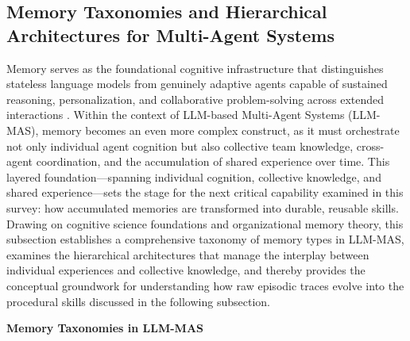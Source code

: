 \documentclass[11pt]{article}
\begin{document}
\subsection{Memory Taxonomies and Hierarchical Architectures for Multi-Agent Systems}

Memory serves as the foundational cognitive infrastructure that distinguishes stateless language models from genuinely adaptive agents capable of sustained reasoning, personalization, and collaborative problem-solving across extended interactions \cite{ref112,ref113}. Within the context of LLM-based Multi-Agent Systems (LLM-MAS), memory becomes an even more complex construct, as it must orchestrate not only individual agent cognition but also collective team knowledge, cross-agent coordination, and the accumulation of shared experience over time. This layered foundation---spanning individual cognition, collective knowledge, and shared experience---sets the stage for the next critical capability examined in this survey: how accumulated memories are transformed into durable, reusable skills. Drawing on cognitive science foundations and organizational memory theory, this subsection establishes a comprehensive taxonomy of memory types in LLM-MAS, examines the hierarchical architectures that manage the interplay between individual experiences and collective knowledge, and thereby provides the conceptual groundwork for understanding how raw episodic traces evolve into the procedural skills discussed in the following subsection.

\textbf{Memory Taxonomies in LLM-MAS}
\end{document}
